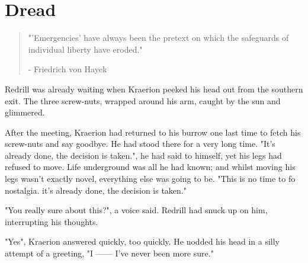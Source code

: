 \documentclass[smalldemyvopaper,11pt,twoside,onecolumn,openright,extrafontsizes]{memoir}
\begin{document}

\chapter{Dread}

\vspace{-1.3cm}
\begin{localsize}{10}
	\begin{quote}
		"'Emergencies' have always been the pretext on which the safeguards of individual liberty have eroded."
		\begin{flushright}- Friedrich von Hayek\end{flushright}
	\end{quote} 
\end{localsize}
\vspace{1cm}

Redrill was already waiting when Kraerion peeked his head out from the southern exit. The three screw-nuts, wrapped around his arm, caught by the sun and glimmered.

After the meeting, Kraerion had returned to his burrow one last time to fetch his screw-nuts and say goodbye. He had stood there for a very long time. 
"It's already done, the decision is taken.", he had said to himself, yet his legs had refused to move. Life underground was all he had known; and whilst moving his legs wasn't exactly novel, everything else was going to be. "This is no time to fo nostalgia. it's already done, the decision is taken."

"You really sure about this?", a voice said. Redrill had snuck up on him, interrupting his thoughts.

"Yes", Kraerion answered quickly, too quickly. He nodded his head in a silly attempt of a greeting, "I —— I've never been more sure."
\end{document}
